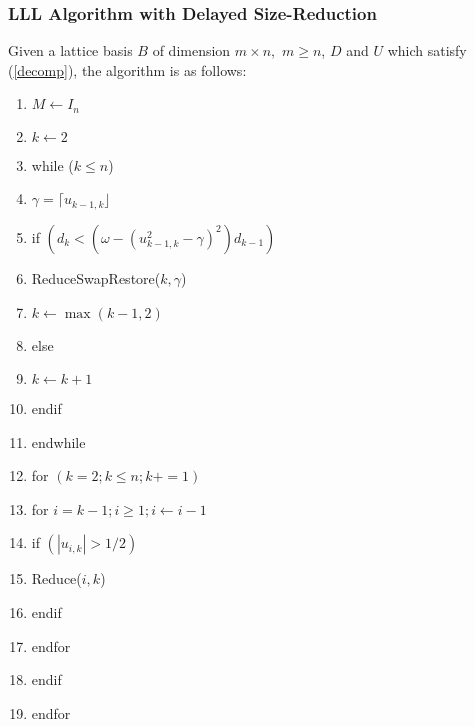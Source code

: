 \documentclass{beamer}
\begin{document}
\begin{frame}
\frametitle{LLL Algorithm with Delayed Size-Reduction}
Given a lattice basis $B$ of dimension $m\times n,$ $m\geq n$, $D$ and $U$ which satisfy (\ref{decomp}), the algorithm is as follows:
\begin{tiny}
\begin{enumerate}[1]
\item $M\leftarrow I_n$
\item $k\leftarrow 2$
\item while ($k\leq n$)
\item \hspace{2em} $\gamma=\lceil u_{k-1,k} \rfloor $
\item \hspace{2em} if $\left(d_k<(\omega -(u^2_{k-1,k}-\gamma)^2)d_{k-1}\right)$
\item \hspace{2em}\hspace{2em} ReduceSwapRestore($k,\gamma$)
\item \hspace{2em}\hspace{2em} $k\leftarrow\max(k-1,2)$
\item \hspace{2em} else
\item \hspace{2em}\hspace{2em} $k\leftarrow k+1$
\item \hspace{2em} endif
\item endwhile
\item for $\left(k=2; k\leq n; k+=1\right)$
\item \hspace{2em}\hspace{2em} for $i=k-1; i \geq 1; i\leftarrow i-1$
\item \hspace{2em}\hspace{2em} \hspace{2em} if $\left(|u_{i,k}|>1/2\right)$
\item \hspace{2em}\hspace{2em} \hspace{2em} \hspace{2em} Reduce($i,k$)
\item \hspace{2em}\hspace{2em} \hspace{2em} endif
\item \hspace{2em}\hspace{2em} endfor
\item \hspace{2em} endif
\item endfor
\end{enumerate}
\end{tiny}
\end{frame}
\end{document}
